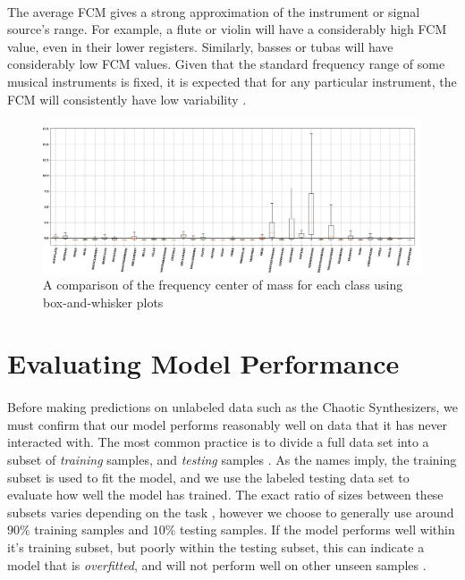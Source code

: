 \documentclass[12pt,letterpaper]{article}
\begin{document}
\paragraph*{}The average FCM gives a strong approximation of the instrument or signal source's range. For example, a flute or violin will have a considerably high FCM value, even in their lower registers. Similarly, basses or tubas will have considerably low FCM values. Given that the standard frequency range of some musical instruments is fixed, it is expected that for any particular instrument, the FCM will consistently have low variability \cite{Olson,White}.

\begin{figure}[H]
\label{fig-FeatureFCM}
\begin{center}
\includegraphics[scale=0.3]{../FiguresFeatures/FCM}
\end{center}
\caption{A comparison of the frequency center of mass for each class using box-and-whisker plots}
\end{figure}


\newpage
\section{Evaluating Model Performance}
\label{sec-PerfEval}

\paragraph*{}Before making predictions on unlabeled data such as the Chaotic Synthesizers, we must confirm that our model performs reasonably well on data that it has never interacted with. The most common practice is to divide a full data set into a subset of \textit{training} samples, and \textit{testing} samples \cite{Geron}. As the names imply, the training subset is used to fit the model, and we use the labeled testing data set to evaluate how well the model has trained. The exact ratio of sizes between these subsets varies depending on the task \cite{Goodfellow,Geron2,Mitchell}, however we choose to generally use around $90\%$ training samples and $10\%$ testing samples. If the model performs well within it's training subset, but poorly within the testing subset, this can indicate a model that is \textit{overfitted}, and will not perform well on other unseen samples \cite{Geron}.
\end{document}

